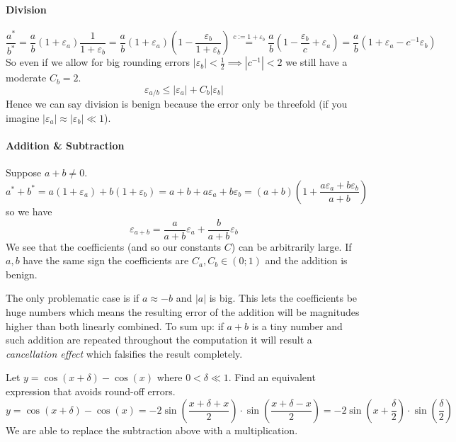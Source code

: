 \paragraph{Division}
\[\frac{a^\ast}{b^\ast} = \frac{a}{b} (1 + \varepsilon_a)\frac{1}{1 + \varepsilon_b} = \frac{a}{b} (1 + \varepsilon_a)\left(1 - \frac{\varepsilon_b}{1 + \varepsilon_b}\right) \overset{c := 1 + \varepsilon_b}{=} \frac{a}{b} \left(1 - \frac{\varepsilon_b}{c} + \varepsilon_a\right) = \frac{a}{b} (1 + \varepsilon_a - c^{-1} \varepsilon_b)\]
So even if we allow for big rounding errors \(|\varepsilon_b| < \frac{1}{2} \implies |c^{-1}| < 2\) we still have a moderate \(C_b = 2\).
\[\varepsilon_{a/b} \leq |\varepsilon_a| + C_b|\varepsilon_b|\]
Hence we can say division is benign because the error only be threefold (if you imagine \(|\varepsilon_a| \approx |\varepsilon_b| \ll 1\)).

\paragraph{Addition \& Subtraction}
Suppose \(a + b \neq 0\).
\[a^\ast + b^\ast = a(1 + \varepsilon_a) + b(1 + \varepsilon_b) = a + b + a\varepsilon_a + b\varepsilon_b = (a + b)\left(1 + \frac{a\varepsilon_a + b \varepsilon_b}{a + b}\right)\]
so we have
\[\varepsilon_{a + b} = \frac{a}{a + b} \varepsilon_a + \frac{b}{a + b}\varepsilon_b\]
We see that the coefficients (and so our constants \(C\)) can be arbitrarily large.
If \(a, b\) have the same sign the coefficients are \(C_a, C_b \in (0; 1)\) and the addition is benign.

The only problematic case is if \(a \approx -b\) and \(|a|\) is big.
This lets the coefficients be huge numbers which means the resulting error of the addition will be magnitudes higher than both linearly combined.
To sum up: if \(a + b\) is a tiny number and such addition are repeated throughout the computation it will result a \emph{cancellation effect} which falsifies the result completely.

\begin{example}
   Let \(y = \cos(x + \delta) - \cos(x)\) where \(0 < \delta \ll 1\).
   Find an equivalent expression that avoids round-off errors.
   \[y = \cos(x + \delta) - \cos(x) = -2\sin\left(\frac{x + \delta + x}{2}\right) \cdot \sin\left(\frac{x + \delta - x}{2}\right) = -2 \sin\left(x + \frac{\delta}{2}\right) \cdot \sin\left(\frac{\delta}{2}\right)\]
   We are able to replace the subtraction above with a multiplication.
\end{example}

